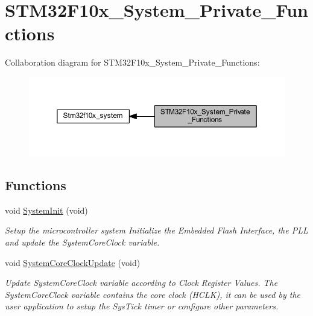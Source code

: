 \hypertarget{group___s_t_m32_f10x___system___private___functions}{}\section{S\+T\+M32\+F10x\+\_\+\+System\+\_\+\+Private\+\_\+\+Functions}
\label{group___s_t_m32_f10x___system___private___functions}
Collaboration diagram for S\+T\+M32\+F10x\+\_\+\+System\+\_\+\+Private\+\_\+\+Functions\+:
\nopagebreak
\begin{figure}[H]
\begin{center}
\leavevmode
\includegraphics[width=350pt]{group___s_t_m32_f10x___system___private___functions}
\end{center}
\end{figure}
\subsection*{Functions}
\begin{DoxyCompactItemize}
\item 
void \hyperlink{group___s_t_m32_f10x___system___private___functions_ga93f514700ccf00d08dbdcff7f1224eb2}{System\+Init} (void)
\begin{DoxyCompactList}\small\item\em Setup the microcontroller system Initialize the Embedded Flash Interface, the P\+LL and update the System\+Core\+Clock variable. \end{DoxyCompactList}\item 
void \hyperlink{group___s_t_m32_f10x___system___private___functions_gae0c36a9591fe6e9c45ecb21a794f0f0f}{System\+Core\+Clock\+Update} (void)
\begin{DoxyCompactList}\small\item\em Update System\+Core\+Clock variable according to Clock Register Values. The System\+Core\+Clock variable contains the core clock (H\+C\+LK), it can be used by the user application to setup the Sys\+Tick timer or configure other parameters. \end{DoxyCompactList}\end{DoxyCompactItemize}


